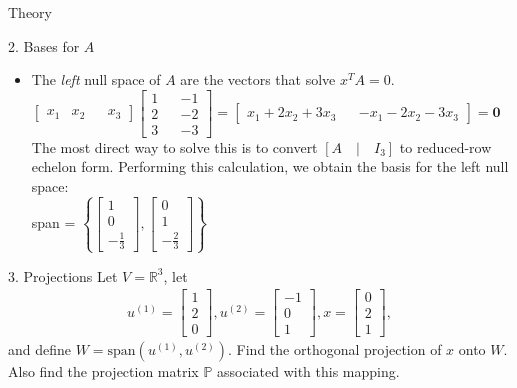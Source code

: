 \begin{section}{Theory}
\begin{homeworkSection}{2. Bases for $A$}
{\begin{itemize}
\item The \textit{left} null space of $A$ are the vectors that solve $x^TA = 0$. \\
$\begin{bmatrix} x_1 & x_2 && x_3 \end{bmatrix} \begin{bmatrix} 1 && -1 \\ 2 && -2 \\ 3 && -3 \end{bmatrix} = \begin{bmatrix} x_1+2x_2+3x_3 && -x_1-2x_2-3x_3 \end{bmatrix} = \bm{0}$ \\
The most direct way to solve this is to convert $ [ A \quad | \quad I_{3}  ] $ to reduced-row echelon form. Performing this calculation, we obtain the basis for the left null space: \\
span = $\left \{ \begin{bmatrix} 1 \\ 0 \\ -\frac{1}{3}\end{bmatrix},
                \begin{bmatrix} 0 \\ 1 \\ -\frac{2}{3}\end{bmatrix} \right \}
        $
\end{itemize}
}

\end{homeworkSection}


\begin{homeworkSection}{3. Projections}
Let $V = \mathbb{R}^3$, let 
\begin{align*}
    u^{(1)} = \begin{bmatrix} 1 \\ 2 \\ 0 \end{bmatrix}, 
    u^{(2)} = \begin{bmatrix} -1 \\ 0 \\ 1 \end{bmatrix}, 
    x = \begin{bmatrix} 0 \\ 2 \\ 1 \end{bmatrix},
\end{align*}
and define $W = \text{span}(u^{(1)}, u^{(2)})$. Find the orthogonal projection of $x$ onto $W$. Also find the projection matrix $\mathbb{P}$ associated with this mapping.


\end{homeworkSection}
\end{section}
